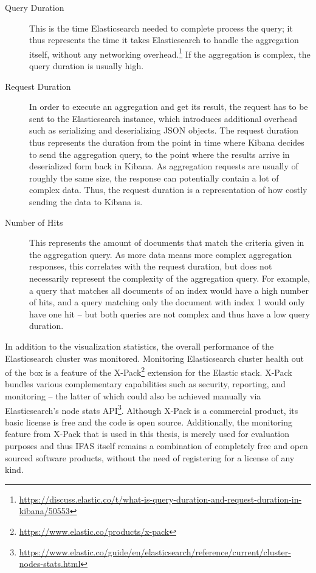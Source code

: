 \begin{description}
\item[Query Duration] This is the time Elasticsearch needed to complete process the query; it thus represents the time it takes Elasticsearch to handle the aggregation itself, without any networking overhead.\footnote{\url{https://discuss.elastic.co/t/what-is-query-duration-and-request-duration-in-kibana/50553}}
If the aggregation is complex, the query duration is usually high.
\item[Request Duration] In order to execute an aggregation and get its result, the request has to be sent to the Elasticsearch instance, which introduces additional overhead such as serializing and deserializing \ac{JSON} objects.
The request duration thus represents the duration from the point in time where Kibana decides to send the aggregation query, to the point where the results arrive in deserialized form back in Kibana.
As aggregation requests are usually of roughly the same size, the response can potentially contain a lot of complex data.
Thus, the request duration is a representation of how costly sending the data to Kibana is.
\item[Number of Hits] This represents the amount of documents that match the criteria given in the aggregation query.
As more data means more complex aggregation responses, this correlates with the request duration, but does not necessarily represent the complexity of the aggregation query.
For example, a query that matches all documents of an index would have a high number of hits, and a query matching only the document with index 1 would only have one hit -- but both queries are not complex and thus have a low query duration.
\end{description}

In addition to the visualization statistics, the overall performance of the Elasticsearch cluster was monitored.
Monitoring Elasticsearch cluster health out of the box is a feature of the X-Pack\footnote{\url{https://www.elastic.co/products/x-pack}} extension for the Elastic stack.
X-Pack bundles various complementary capabilities such as security, reporting, and monitoring -- the latter of which could also be achieved manually via Elasticsearch's node stats API\footnote{\url{https://www.elastic.co/guide/en/elasticsearch/reference/current/cluster-nodes-stats.html}}.
Although X-Pack is a commercial product, its basic license is free and the code is open source.
Additionally, the monitoring feature from X-Pack that is used in this thesis, is merely used for evaluation purposes and thus \ac{IFAS} itself remains a combination of completely free and open sourced software products, without the need of registering for a license of any kind.

